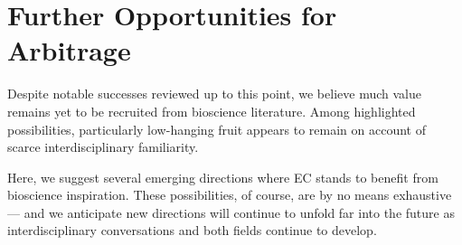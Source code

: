 \section{Further Opportunities for Arbitrage}
\label{sec:future}

Despite notable successes reviewed up to this point, we believe much value remains yet to be recruited from bioscience literature.
Among highlighted possibilities, particularly low-hanging fruit appears to remain on account of scarce interdisciplinary familiarity.

Here, we suggest several emerging directions where EC stands to benefit from bioscience inspiration.
These possibilities, of course, are by no means exhaustive --- and we anticipate new directions will continue to unfold far into the future as interdisciplinary conversations and both fields continue to develop.










